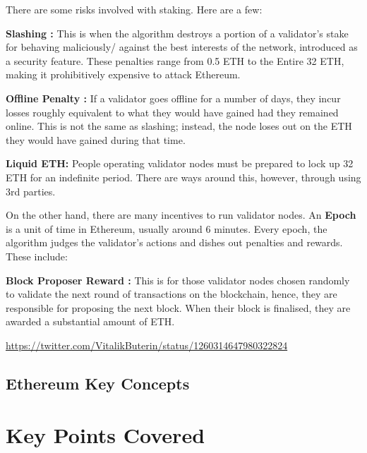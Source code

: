 There are some risks involved with staking. Here are a few:

\textbf{Slashing :}
This is when the algorithm destroys a portion of a validator's stake for behaving maliciously/ against the best interests of the network, introduced as a security feature. These penalties range from 0.5 ETH to the Entire 32 ETH, making it prohibitively expensive to attack Ethereum. 

\textbf{Offline Penalty :}
If a validator goes offline for a number of days, they incur losses roughly equivalent to what they would have gained had they remained online. This is not the same as slashing; instead, the node loses out on the ETH they would have gained during that time.

\textbf{Liquid ETH: }
People operating validator nodes must be prepared to lock up 32 ETH for an indefinite period. There are ways around this, however, through using 3rd parties. 
 
On the other hand, there are many incentives to run validator nodes. An \textbf{Epoch} is a unit of time in Ethereum, usually around 6 minutes. Every epoch, the algorithm judges the validator's actions and dishes out penalties and rewards. These include:

\textbf{Block Proposer Reward :}
This is for those validator nodes chosen randomly to validate the next round of transactions on the blockchain, hence, they are responsible for proposing the next block. When their block is finalised, they are awarded a substantial amount of ETH.



\url{https://twitter.com/VitalikButerin/status/1260314647980322824}



\subsection{Ethereum Key Concepts}




\section{Key Points Covered}

